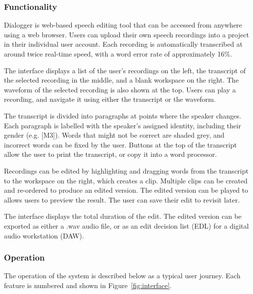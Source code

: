 \subsubsection{Functionality}
Dialogger is web-based speech editing tool that can be accessed from anywhere using a web browser.  Users can upload
their own speech recordings into a project in their individual user account. Each recording is automatically
transcribed at around twice real-time speed, with a word error rate of approximately 16\%.

The interface displays a list of the user's recordings on the left, the transcript of the selected recording in the
middle, and a blank workspace on the right. The waveform of the selected recording is also shown at the top.  Users can
play a recording, and navigate it using either the transcript or the waveform.

The transcript is divided into paragraphs at points where the speaker changes. Each paragraph is labelled with the
speaker's assigned identity, including their gender (e.g. [M3]). Words that might not be correct are shaded grey, and
incorrect words can be fixed by the user. Buttons at the top of the transcript allow the user to print the transcript,
or copy it into a word processor.

Recordings can be edited by highlighting and dragging words from the transcript to the workspace on the right, which
creates a clip. Multiple clips can be created and re-ordered to produce an edited version. The edited version can be
played to allows users to preview the result. The user can save their edit to revisit later.

The interface displays the total duration of the edit. The edited version can be exported as either a .wav audio file,
or as an edit decision list (EDL) for a digital audio workstation (DAW).

\subsubsection{Operation}
The operation of the system is described below as a typical user journey. Each
feature is numbered and shown in Figure~\ref{fig:interface}.

